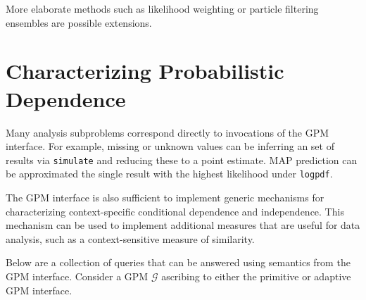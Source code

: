 \documentclass[10pt,letterpaper]{article}
\newcommand{\G}{\mathcal{G}}
\begin{document}
More elaborate methods such as likelihood weighting or particle
filtering ensembles are possible extensions.

\section{Characterizing Probabilistic Dependence}

Many analysis subproblems correspond directly to invocations of the GPM
interface. For example, missing or unknown values can be inferring an set of
results via \texttt{simulate} and reducing these to a point estimate. MAP
prediction can be approximated the single result with the highest likelihood
under \texttt{logpdf}.

The GPM interface is also sufficient to implement generic mechanisms for
characterizing context-specific conditional dependence and independence. This
mechanism can be used to implement additional measures that are useful for data
analysis, such as a context-sensitive measure of similarity.

Below are a collection of queries that can be answered using semantics from the
GPM interface. Consider a GPM $\G$ ascribing to either the primitive or
adaptive GPM interface.
\end{document}

